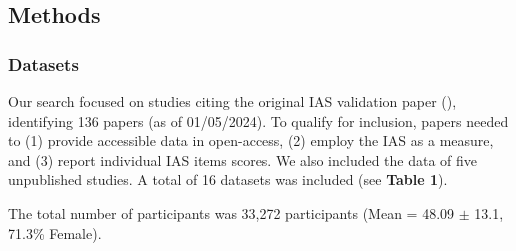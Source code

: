 \documentclass[
  jou,
  floatsintext,
  longtable,
  nolmodern,
  notxfonts,
  notimes,
  colorlinks=true,linkcolor=blue,citecolor=blue,urlcolor=blue]{apa7}
\begin{document}
\subsection{Methods}\label{methods}

\subsubsection{Datasets}\label{datasets}

Our search focused on studies citing the original IAS validation paper
(), identifying 136 papers
(as of 01/05/2024). To qualify for inclusion, papers needed to (1)
provide accessible data in open-access, (2) employ the IAS as a measure,
and (3) report individual IAS items scores. We also included the data of
five unpublished studies. A total of 16 datasets was included (see
\textbf{Table 1}).

The total number of participants was 33,272 participants (Mean = 48.09
\(\pm\) 13.1, 71.3\% Female).
\end{document}
